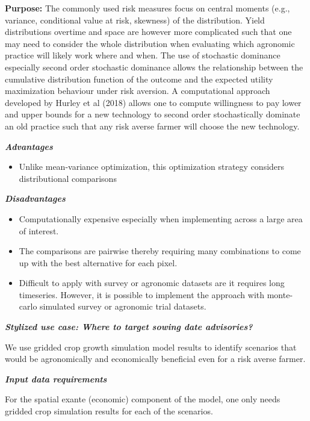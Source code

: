 \documentclass[
  letterpaper,
  DIV=11,
  numbers=noendperiod]{scrreprt}
\providecommand{\tightlist}{%
  \setlength{\itemsep}{0pt}\setlength{\parskip}{0pt}}\usepackage{longtable,booktabs,array}
\begin{document}
\textbf{Purpose:} The commonly used risk measures focus on central
moments (e.g., variance, conditional value at risk, skewness) of the
distribution. Yield distributions overtime and space are however more
complicated such that one may need to consider the whole distribution
when evaluating which agronomic practice will likely work where and
when. The use of stochastic dominance especially second order stochastic
dominance allows the relationship between the cumulative distribution
function of the outcome and the expected utility maximization behaviour
under risk aversion. A computational approach developed by Hurley et al
(2018) allows one to compute willingness to pay lower and upper bounds
for a new technology to second order stochastically dominate an old
practice such that any risk averse farmer will choose the new
technology.

\textbf{\emph{Advantages}}

\begin{itemize}
\tightlist
\item
  Unlike mean-variance optimization, this optimization strategy
  considers distributional comparisons
\end{itemize}

\textbf{\emph{Disadvantages}}

\begin{itemize}
\item
  Computationally expensive especially when implementing across a large
  area of interest.
\item
  The comparisons are pairwise thereby requiring many combinations to
  come up with the best alternative for each pixel.
\item
  Difficult to apply with survey or agronomic datasets are it requires
  long timeseries. However, it is possible to implement the approach
  with monte-carlo simulated survey or agronomic trial datasets.
\end{itemize}

\textbf{\emph{Stylized use case: Where to target sowing date
advisories?}}

We use gridded crop growth simulation model results to identify
scenarios that would be agronomically and economically beneficial even
for a risk averse farmer.

\textbf{\emph{Input data requirements}}

For the spatial exante (economic) component of the model, one only needs
gridded crop simulation results for each of the scenarios.
\end{document}
